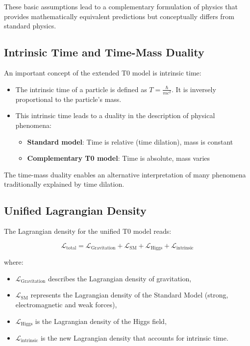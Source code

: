 \documentclass[a4paper,12pt]{article}
\begin{document}
	These basic assumptions lead to a complementary formulation of physics that provides mathematically equivalent predictions but conceptually differs from standard physics.
	
	\subsection{Intrinsic Time and Time-Mass Duality}
	
	An important concept of the extended T0 model is intrinsic time:
	
	\begin{itemize}
		\item The intrinsic time of a particle is defined as $T = \frac{\hbar}{mc^2}$. It is inversely proportional to the particle's mass.
		\item This intrinsic time leads to a duality in the description of physical phenomena:
		\begin{itemize}
			\item \textbf{Standard model}: Time is relative (time dilation), mass is constant
			\item \textbf{Complementary T0 model}: Time is absolute, mass varies
		\end{itemize}
	\end{itemize}
	
	The time-mass duality enables an alternative interpretation of many phenomena traditionally explained by time dilation.
	
	\subsection{Unified Lagrangian Density}
	
	The Lagrangian density for the unified T0 model reads:
	
	\begin{equation}
		\mathcal{L}_\text{total} = \mathcal{L}_\text{Gravitation} + \mathcal{L}_\text{SM} + \mathcal{L}_\text{Higgs} + \mathcal{L}_\text{intrinsic}
	\end{equation}
	
	where:
	\begin{itemize}
		\item $\mathcal{L}_\text{Gravitation}$ describes the Lagrangian density of gravitation,
		\item $\mathcal{L}_\text{SM}$ represents the Lagrangian density of the Standard Model (strong, electromagnetic and weak forces),
		\item $\mathcal{L}_\text{Higgs}$ is the Lagrangian density of the Higgs field,
		\item $\mathcal{L}_\text{intrinsic}$ is the new Lagrangian density that accounts for intrinsic time.
	\end{itemize}
	
\end{document}
